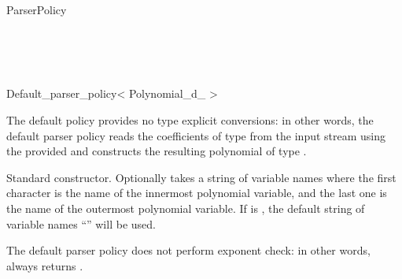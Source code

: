 \begin{ccRefConcept}{ParserPolicy}
\ccSeeAlso

\ccHasModels

\\
\\
\\

\end{ccRefConcept}

\begin{ccRefClass} {Default_parser_policy< Polynomial_d_ >}

\ccDefinition
The default policy provides no type explicit conversions: in other words, the default parser
policy reads the coefficients of type  from the input
stream using the provided  and constructs the resulting polynomial of type .


\ccIsModel
{}

\ccTypes

\ccGlue
{}\ccGlue


\ccCreation
{}

{Standard constructor. Optionally takes a string of variable names  
where the first character is the name of the innermost polynomial variable, and the last one 
is the name of the outermost polynomial variable. If  is , the default
string of variable names ``'' will be used.}

The default parser policy does not perform exponent check: in other words,  always returns .

\ccSeeAlso
{}\\
\\


\end{ccRefClass}

